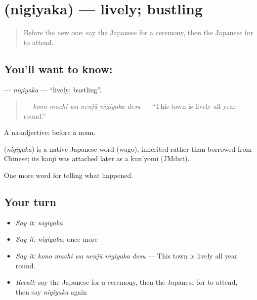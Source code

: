 \section[\texorpdfstring{\ja{にぎやか} (nigiyaka)}{にぎやか (nigiyaka)}]{ (nigiyaka) — lively; bustling}

\label{lesson:JA-C288-nigiyaka}



\begin{quote}
Before the new one: say the Japanese for a ceremony, then the Japanese for to attend.
\end{quote}

\subsection*{You'll want to know: }
\textbf{} — \emph{nigiyaka} — \textquotedblleft{}lively; bustling\textquotedblright{}.

\begin{quote}
\textbf{   } — \emph{kono machi wa nenjū nigiyaka desu} — \textquotedblleft{}This town is lively all year round.\textquotedblright{}
\end{quote}

A na-adjective:  before a noun.

\begin{cousinweb}
\textbf{} (\emph{nigiyaka}) is a native Japanese word (wago), inherited rather than borrowed from Chinese; its kanji was attached later as a kun'yomi (JMdict).
\end{cousinweb}

\begin{grammarlens}[title={What you've built}]
One more word for telling what happened.
\end{grammarlens}

\subsection*{Your turn}
\begin{itemize}
\raggedright
  \item \emph{Say it:} \emph{nigiyaka}
  \item \emph{Say it:} \emph{nigiyaka}, once more
  \item \emph{Say it:} \emph{kono machi wa nenjū nigiyaka desu} — This town is lively all year round.
  \item \emph{Recall:} say the Japanese for a ceremony, then the Japanese for to attend, then say \emph{nigiyaka} again
\end{itemize}

